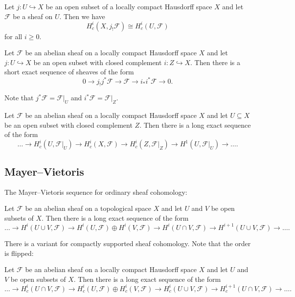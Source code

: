 \begin{lem}[name={Additional exercise~13.1(d)}]
Let \(j\colon U\hookrightarrow X\) be an open subset of a locally compact Hausdorff space \(X\) and let \(\mathcal F\) be a sheaf on \(U\).
Then we have
\[ H^i_c(X,j_!\mathcal F) \cong H^i_c(U,\mathcal F) \]
for all \(i\geq 0\).
\end{lem}

\begin{lem}[name={Homework~3, Exercise~4(d)}]
Let \(\mathcal F\) be an abelian sheaf on a locally compact Hausdorff space \(X\) and let \(j\colon U\hookrightarrow X\) be an open subset with closed complement \(i\colon Z\hookrightarrow X\).
Then there is a short exact sequence of sheaves of the form
\[ 0 \to j_!j^*\mathcal F \to \mathcal F \to i_*i^*\mathcal F \to 0\text{.} \]
\end{lem}

Note that \(j^*\mathcal F=\mathcal F|_U\) and \(i^*\mathcal F=\mathcal F|_Z\).

\begin{cor}[name={open--closed sequence, \cref{lem:open-closed-sequence}}]
Let \(\mathcal F\) be an abelian sheaf on a locally compact Hausdorff space \(X\) and let \(U\subseteq X\) be an open subset with closed complement \(Z\).
Then there is a long exact sequence of the form
\[ \dots \to H^i_c(U,\mathcal F|_U) \to H^i_c(X,\mathcal F) \to H^i_c(Z,\mathcal F|_Z) \to H^1(U,\mathcal F|_U) \to \dots\text{.} \]
\end{cor}

\subsection{Mayer--Vietoris}
The Mayer--Vietoris sequence for ordinary sheaf cohomology:
\begin{prop}[name={Mayer--Vietoris sequence, Homework~7, Exercise~1(c)}]
Let \(\mathcal F\) be an abelian sheaf on a topological space \(X\) and let \(U\) and \(V\) be open subsets of \(X\).
Then there is a long exact sequence of the form
\[ \dots \to H^i(U\cup V,\mathcal F) \to H^i(U,\mathcal F)\oplus H^i(V,\mathcal F) \to H^i(U\cap V,\mathcal F) \to H^{i+1}(U\cup V,\mathcal F)\to\dots\text{.} \]
\end{prop}

There is a variant for compactly supported sheaf cohomology.
Note that the order is flipped:
\begin{prop}[name={compactly supported Mayer--Vietoris sequence, Additional exercise~13.2}]
Let \(\mathcal F\) be an abelian sheaf on a locally compact Hausdorff space \(X\) and let \(U\) and \(V\) be open subsets of \(X\).
Then there is a long exact sequence of the form
\[ \dots \to H^i_c(U\cap V,\mathcal F) \to H^i_c(U,\mathcal F)\oplus H^i_c(V,\mathcal F) \to H^i_c(U\cup V,\mathcal F) \to H^{i+1}_c(U\cap V,\mathcal F)\to\dots\text{.} \]
\end{prop}

